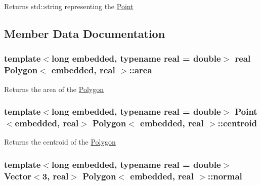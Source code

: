 \begin{DoxyReturn}{\-Returns}
std\-::string representing the \hyperlink{class_point}{\-Point} 
\end{DoxyReturn}


\subsection{\-Member \-Data \-Documentation}
\hypertarget{class_polygon_a97237c3271514d911648c249b3078842}{
\subsubsection[{area}]{\setlength{\rightskip}{0pt plus 5cm}template$<$long embedded, typename real = double$>$ real {\bf \-Polygon}$<$ embedded, real $>$\-::{\bf area}}}\label{class_polygon_a97237c3271514d911648c249b3078842}
\begin{DoxyReturn}{\-Returns}
the area of the \hyperlink{class_polygon}{\-Polygon} 
\end{DoxyReturn}
\hypertarget{class_polygon_a26dc4392a659ca45b70410260e7c890d}{
\subsubsection[{centroid}]{\setlength{\rightskip}{0pt plus 5cm}template$<$long embedded, typename real = double$>$ {\bf \-Point}$<$embedded, real$>$ {\bf \-Polygon}$<$ embedded, real $>$\-::{\bf centroid}}}\label{class_polygon_a26dc4392a659ca45b70410260e7c890d}
\begin{DoxyReturn}{\-Returns}
the centroid of the \hyperlink{class_polygon}{\-Polygon} 
\end{DoxyReturn}
\hypertarget{class_polygon_a23acd35ab3af1494250f68fe733f2a1c}{
\subsubsection[{normal}]{\setlength{\rightskip}{0pt plus 5cm}template$<$long embedded, typename real = double$>$ \-Vector$<$3, real$>$ {\bf \-Polygon}$<$ embedded, real $>$\-::{\bf normal}}}\label{class_polygon_a23acd35ab3af1494250f68fe733f2a1c}
